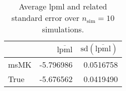 \begin{table}[H]

\caption{Average lpml and related standard error over $n_{\text{sim}} = 10$ simulations.}
\centering
\begin{tabular}[t]{lrr}
\toprule
  & $\overbar{\text{lpml}}$ & $\text{sd}(\overbar{\text{lpml}})$\\
\midrule
msMK & -5.796986 & 0.0516758\\
True & -5.676562 & 0.0419490\\
\bottomrule
\end{tabular}
\end{table}